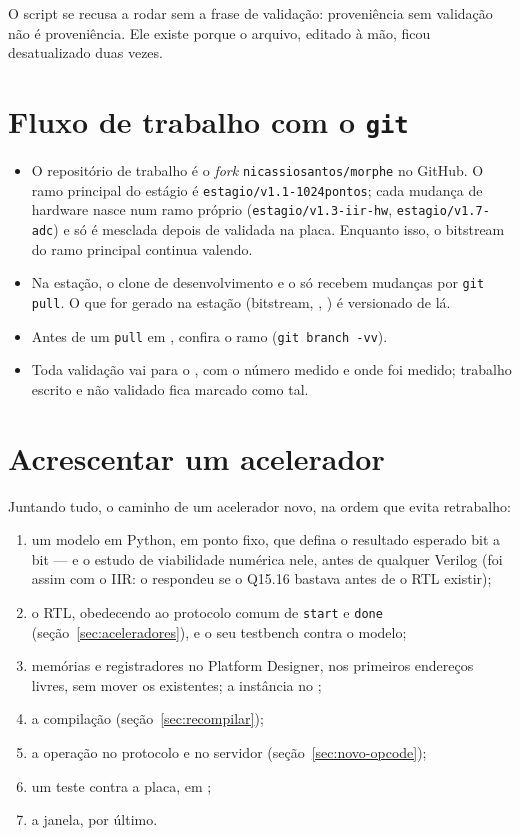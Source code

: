 O script se recusa a rodar sem a frase de validação: proveniência sem validação
não é proveniência. Ele existe porque o arquivo, editado à mão, ficou
desatualizado duas vezes.

\section{Fluxo de trabalho com o \texttt{git}}

\begin{itemize}
  \item O repositório de trabalho é o \emph{fork} \texttt{nicassiosantos/morphe}
    no GitHub. O ramo principal do estágio é
    \texttt{estagio/v1.1-1024pontos}; cada mudança de hardware nasce num ramo
    próprio (\texttt{estagio/v1.3-iir-hw}, \texttt{estagio/v1.7-adc}) e só é
    mesclada depois de validada na placa. Enquanto isso, o bitstream do ramo
    principal continua valendo.
  \item Na estação, o clone de desenvolvimento e o  só recebem
    mudanças por \texttt{git pull}. O que for gerado na estação (bitstream,
    , ) é versionado de lá.
  \item Antes de um \texttt{pull} em , confira o ramo
    (\texttt{git branch -vv}).
  \item Toda validação vai para o , com o número medido e
    onde foi medido; trabalho escrito e não validado fica marcado como tal.
\end{itemize}

\section{Acrescentar um acelerador}

Juntando tudo, o caminho de um acelerador novo, na ordem que evita retrabalho:

\begin{enumerate}
  \item um modelo em Python, em ponto fixo, que defina o resultado esperado bit
    a bit --- e o estudo de viabilidade numérica nele, antes de qualquer
    Verilog (foi assim com o IIR: o  respondeu
    se o Q15.16 bastava antes de o RTL existir);
  \item o RTL, obedecendo ao protocolo comum de \texttt{start} e \texttt{done}
    (seção~\ref{sec:aceleradores}), e o seu testbench contra o modelo;
  \item memórias e registradores no Platform Designer, nos primeiros endereços
    livres, sem mover os existentes; a instância no ;
  \item a compilação (seção~\ref{sec:recompilar});
  \item a operação no protocolo e no servidor (seção~\ref{sec:novo-opcode});
  \item um teste contra a placa, em ;
  \item a janela, por último.
\end{enumerate}
